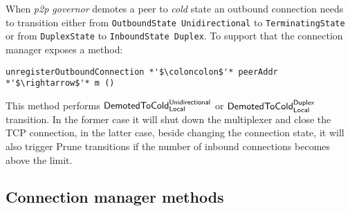 \documentclass{article}
\def\TCP{\textsf{TCP}}
\def\OutboundStateUni{\texttt{OutboundState Unidirectional}}
\def\DuplexState{\texttt{DuplexState}}
\def\InboundStateDup{\texttt{InboundState Duplex}}
\def\TerminatingState{\texttt{TerminatingState}}
\def\DemotedToColdDupLoc{$\text{\textsf{DemotedToCold}}^\text{\textsf{Duplex}}_\text{\textsf{Local}}$}
\def\DemotedToColdUniLoc{$\text{\textsf{DemotedToCold}}^\text{\textsf{Unidirectional}}_\text{\textsf{Local}}$}
\def\Prune{\textsf{Prune}}
\def\cold{\textit{cold}}
\def\ptopgov{\textit{p2p governor}}
\begin{document}
When \ptopgov{} demotes a peer to \cold{} state an outbound
connection needs to transition either from \OutboundStateUni{} to
\TerminatingState{} or from \DuplexState{} to \InboundStateDup{}.  To
support that the connection manager exposes a method:
\begin{lstlisting}
unregisterOutboundConnection *'$\coloncolon$'* peerAddr *'$\rightarrow$'* m ()
\end{lstlisting}
This method performs \DemotedToColdUniLoc{} or
\DemotedToColdDupLoc{} transition. In the former case it will shut down the
multiplexer and close the \TCP{} connection, in the latter case, beside
changing the connection state, it will also trigger \Prune{} transitions if
the number of inbound connections becomes above the limit.

\subsection{Connection manager methods}
\end{document}

